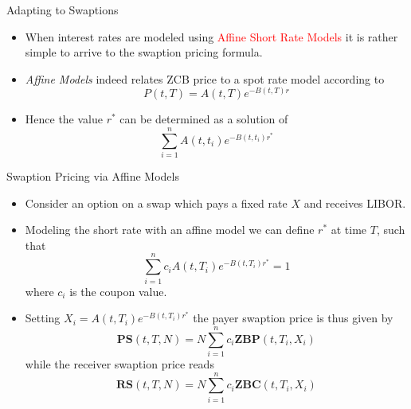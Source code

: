 \documentclass{beamer}
\begin{document}
\begin{frame}{Adapting to Swaptions}
\begin{itemize}
	\item When interest rates are modeled using \textcolor{red}{Affine Short Rate Models} it is rather simple to arrive to the swaption pricing formula.
	\item \emph{Affine Models} indeed relates ZCB price to a spot rate model according to 
	\begin{equation*}
		P(t,T) = A(t,T)e^{-B(t,T)r}
	\end{equation*} 
	\item Hence the value $r^*$ can be determined as a solution of 
	\begin{equation*}
		\sum_{i=1}^n A(t,t_i)e^{-B(t,t_i)r^*}
	\end{equation*}		
\end{itemize}
\end{frame}

\begin{frame}{Swaption Pricing via Affine Models}
\begin{itemize}
	\item Consider an option on a swap which pays a fixed rate $X$ and receives LIBOR.  
	\item Modeling the short rate with an affine model we can define $r^*$ at time $T$, such that
	\begin{equation*}
		\sum_{i=1}^n c_i A(t,T_i)e^{-B(t,T_i)r^*} = 1
	\end{equation*}
	where $c_i$ is the coupon value.
	\item Setting $X_i = A(t,T_i)e^{-B(t,T_i)r^*}$ the payer swaption price is thus given by
	\begin{equation}
		\textbf{PS}(t,T,N) = N\sum_{i=1}^n c_i \textbf{ZBP}(t,T_i,X_i)
	\end{equation}
	while the receiver swaption price reads
	\begin{equation}
		\textbf{RS}(t,T,N) = N\sum_{i=1}^n c_i \textbf{ZBC}(t,T_i,X_i)
	\end{equation}
\end{itemize}
\end{frame}
\end{document}
